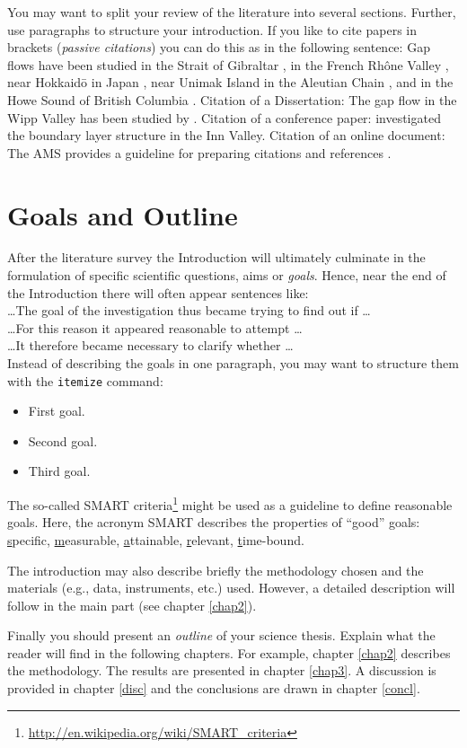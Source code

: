 You may want to split your review of the literature into several sections.
Further, use paragraphs to structure your introduction. If you like to cite
papers in brackets (\emph{passive citations}) you can do this
as in the following sentence: Gap flows have been studied in the Strait
of Gibraltar \citep{scor52Aag,dorm95Aag}, in the French Rh\^one Valley
\citep{pett82Aag}, near Hokkaid\=o in Japan \citep{arak69Aag}, near
Unimak Island in the Aleutian Chain \citep{pan-99Aag}, and in the Howe
Sound of British Columbia \citep{jack94Aag,jack94Bag}. Citation of a
Dissertation: The gap flow in the Wipp Valley has been studied by
\citet{gohm03Aag}. Citation of a conference paper: \citet{gohm06Aag}
investigated the boundary layer structure in the Inn Valley. Citation of an
online document: The AMS provides a guideline for preparing citations and
references \citep{ams-09Aag}.


\section{Goals and Outline}\label{1sec:3}

After the literature survey the Introduction will ultimately culminate in the
formulation of specific scientific questions, aims or \emph{goals}. Hence, near
the end of the Introduction there will often appear sentences like:\\[1ex]
\dots The goal of the investigation thus became trying to find out if \dots\\
\dots For this reason it appeared reasonable to attempt \dots\\
\dots It therefore became necessary to clarify whether \dots\\ 

Instead of describing the goals in one paragraph, you may want to structure them
with the \verb|itemize| command:
\begin{itemize}
\item[(1)] First goal.
\item[(2)] Second goal.
\item[(3)] Third goal.
\end{itemize}

The so-called SMART
criteria\footnote{\url{http://en.wikipedia.org/wiki/SMART_criteria}} might be
used as a guideline to define reasonable goals. Here, the acronym SMART
describes the properties of ``good'' goals: \underline{s}pecific,
\underline{m}easurable, \underline{a}ttainable, \underline{r}elevant,
\underline{t}ime-bound.

The introduction may also describe briefly the methodology chosen and the
materials (e.g., data, instruments, etc.) used. However, a detailed description
will follow in the main part (see chapter \ref{chap2}).

Finally you should present an \emph{outline} of your science thesis. Explain
what the reader will find in the following chapters. For example, chapter
\ref{chap2} describes the methodology. The results are presented
in chapter \ref{chap3}. A discussion is provided in chapter \ref{disc} and the
conclusions are drawn in chapter \ref{concl}.
